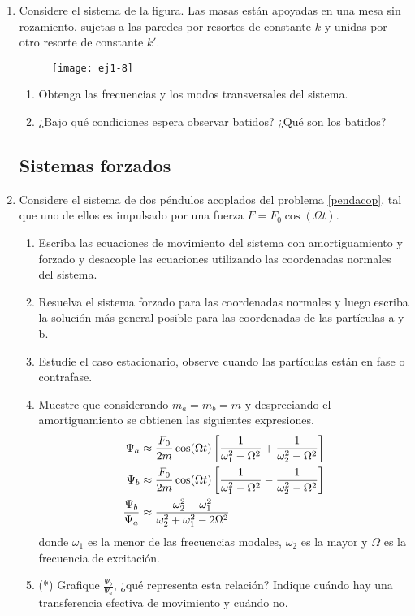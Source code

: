 \documentclass[11pt,spanish,a4paper]{article}
\begin{document}
\begin{enumerate}
\item \label{2masitas} Considere el sistema de la figura. Las masas están apoyadas en una mesa sin rozamiento, sujetas a las paredes por resortes de constante
$k$ y unidas por otro resorte de constante $k'$.
\begin{figure}[h]
\centering{}\texttt{[image: ej1-8]}
\end{figure}
\begin{enumerate}
	\item Obtenga las frecuencias y los modos transversales del sistema. 
	\item ¿Bajo qué condiciones espera observar batidos?
	¿Qué son los batidos?
\end{enumerate}


\subsection*{Sistemas forzados}
\item Considere el sistema de dos péndulos acoplados del problema \ref{pendacop}, tal que uno de ellos es impulsado por una fuerza $F= F_0 \cos(\Omega t)$.  
\begin{enumerate}
	\item Escriba las ecuaciones de movimiento del sistema con amortiguamiento y forzado y desacople las ecuaciones utilizando las coordenadas normales del sistema.
	\item Resuelva el sistema forzado para las coordenadas normales y luego escriba la solución más general posible para las coordenadas de las partículas a y b.
	\item Estudie el caso estacionario, observe cuando las partículas están en fase o contrafase.
	\item Muestre que considerando $m_a= m_b= m$ y despreciando el amortiguamiento se obtienen las siguientes expresiones.
		\begin{align}
			\Psi_{a} &\approx \frac{F_{0}}{2m}\cos(\Omega t)\left[\frac{1}{\omega_{1}^{2}-\Omega^{2}} + \frac{1}{\omega_{2}^{2}-\Omega^{2}}\right] \notag \\
			\Psi_{b} &\approx \frac{F_{0}}{2m}\cos(\Omega t)\left[\frac{1}{\omega_{1}^{2}-\Omega^{2}} - \frac{1}{\omega_{2}^{2}-\Omega^{2}}\right] \notag \\
			\frac{\Psi_{b}}{\Psi_{a}} &\approx \frac{\omega_{2}^{2}-\omega_{1}^{2}}{\omega_{2}^{2}+\omega_{1}^{2}-2\Omega^{2}} \notag
		\end{align}
	donde $\omega_{1}$ es la menor de las frecuencias modales, $\omega_{2}$ es la mayor y $\Omega$ es la frecuencia de excitación.
	\item (*) Grafique $\frac{\Psi_{b}}{\Psi_{a}}$, ¿qué representa esta relación?
	Indique cuándo hay una transferencia efectiva de movimiento y cuándo no.
\end{enumerate}



\end{enumerate}
\end{document}
